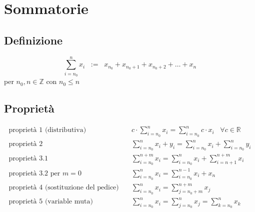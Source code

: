 \documentclass[a4paper]{article}
\begin{document}
\newpage

\section{Sommatorie}
\subsection{Definizione}
\[\sum_{i = n_0} ^ {n} x_i \;\; := \;\; x_{n_0} + x_{n_0+1} + x_{n_0+2} + \dots + x_n\] per \(n_0, n \in \mathbb{Z}\) con \(n_0 \leq n\)


\subsection{Proprietà}
\begin{align*}
	\text{proprietà 1 (distributiva)} \quad & c \cdot \sum_{i = n_0} ^ {n} x_i = \sum_{i = n_0} ^ {n} c \cdot x_i \;\; \; \forall c \in \mathbb{R} \\
	\text{proprietà 2} \quad & \sum_{i = n_0} ^ {n} x_i + y_i = \sum_{i = n_0} ^ {n} x_i + \sum_{i = n_0} ^ {n} y_i \\
	\text{proprietà 3.1} \quad & \sum_{i = n_0} ^ {n + m} x_i = \sum_{i = n_0} ^ {n} x_i + \sum_{i = n + 1} ^ {n + m} x_i \\
	\text{proprietà 3.2 per \(m = 0\)} \quad & \sum_{i = n_0} ^ {n} x_i = \sum_{i = n_0} ^ {n-1} x_i + x_n \\
	\text{proprietà 4 (sostituzione del pedice)} \quad & \sum_{i = n_0} ^ {n} x_i = \sum_{j = n_0 + m} ^ {n + m} x_j \\
	\text{proprietà 5 (variable muta)} \quad & \sum_{i = n_0} ^ {n} x_i = \sum_{j = n_0} ^ {n} x_j = \sum_{k = n_0} ^ {n} x_k
\end{align*}
\end{document}
